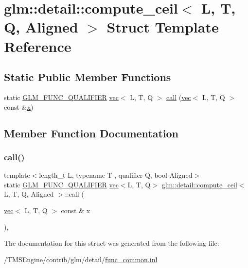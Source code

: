 \hypertarget{structglm_1_1detail_1_1compute__ceil}{}\section{glm\+:\+:detail\+:\+:compute\+\_\+ceil$<$ L, T, Q, Aligned $>$ Struct Template Reference}
\label{structglm_1_1detail_1_1compute__ceil}
\subsection*{Static Public Member Functions}
\begin{DoxyCompactItemize}
\item 
static \hyperlink{setup_8hpp_a33fdea6f91c5f834105f7415e2a64407}{G\+L\+M\+\_\+\+F\+U\+N\+C\+\_\+\+Q\+U\+A\+L\+I\+F\+I\+ER} \hyperlink{structglm_1_1vec}{vec}$<$ L, T, Q $>$ \hyperlink{structglm_1_1detail_1_1compute__ceil_aa0594e4c508780f45c9f7956e143e591}{call} (\hyperlink{structglm_1_1vec}{vec}$<$ L, T, Q $>$ const \&\hyperlink{_s_d_l__opengl_8h_ad0e63d0edcdbd3d79554076bf309fd47}{x})
\end{DoxyCompactItemize}


\subsection{Member Function Documentation}
\mbox{\label{structglm_1_1detail_1_1compute__ceil_aa0594e4c508780f45c9f7956e143e591}} 
\subsubsection{\texorpdfstring{call()}{call()}}
{\footnotesize\ttfamily template$<$length\+\_\+t L, typename T , qualifier Q, bool Aligned$>$ \\
static \hyperlink{setup_8hpp_a33fdea6f91c5f834105f7415e2a64407}{G\+L\+M\+\_\+\+F\+U\+N\+C\+\_\+\+Q\+U\+A\+L\+I\+F\+I\+ER} \hyperlink{structglm_1_1vec}{vec}$<$L, T, Q$>$ \hyperlink{structglm_1_1detail_1_1compute__ceil}{glm\+::detail\+::compute\+\_\+ceil}$<$ L, T, Q, Aligned $>$\+::call (\begin{DoxyParamCaption}\item[{\hyperlink{structglm_1_1vec}{vec}$<$ L, T, Q $>$ const \&}]{x }\end{DoxyParamCaption})\hspace{0.3cm}{\ttfamily [inline]}, {\ttfamily [static]}}



The documentation for this struct was generated from the following file\+:\begin{DoxyCompactItemize}
\item 
/\+T\+M\+S\+Engine/contrib/glm/detail/\hyperlink{func__common_8inl}{func\+\_\+common.\+inl}\end{DoxyCompactItemize}
